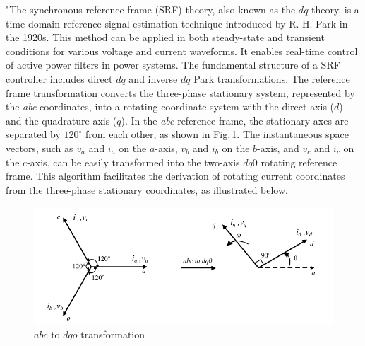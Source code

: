 "The synchronous reference frame (SRF) theory, also known as the $dq$ theory, is a time-domain reference signal estimation technique introduced by R. H. Park in the 1920s. This method can be applied in both steady-state and transient conditions for various voltage and current waveforms. It enables real-time control of active power filters in power systems. The fundamental structure of a SRF controller includes direct $dq$ and inverse $dq$ Park transformations. The reference frame transformation converts the three-phase stationary system, represented by the \textit{abc} coordinates, into a rotating coordinate system with the direct axis ($d$) and the quadrature axis ($q$). In the \textit{abc} reference frame, the stationary axes are separated by $120^{\circ}$ from each other, as shown in Fig.\,\ref{fig2.4}. The instantaneous space vectors, such as $v_a$ and $i_a$ on the $a$-axis, $v_b$ and $i_b$ on the $b$-axis, and $v_c$ and $i_c$ on the $c$-axis, can be easily transformed into the two-axis $dq0$ rotating reference frame. This algorithm facilitates the derivation of rotating current coordinates from the three-phase stationary coordinates, as illustrated below.

\begin{figure}[ht]
	\centering
		\includegraphics[scale=01]{figures/Chapter_1_2/fig2p4}
	\caption{$abc$ to $dqo$ transformation}
	\label{fig2.4}
\end{figure}

